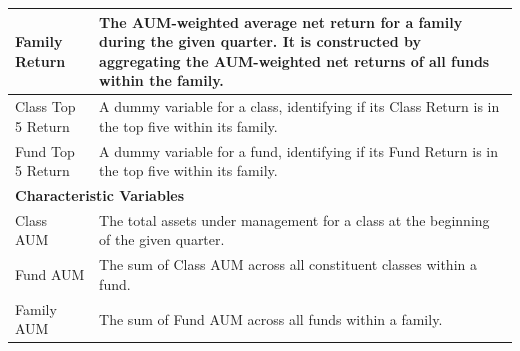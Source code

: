 \begin{longtable}{lp{}}
    \midrule
    Family Return                  & The AUM-weighted average net return for a family during the given quarter. It is constructed by aggregating the AUM-weighted net returns of all funds within the family.                                                                                                                                          \\
    \midrule
    Class Top 5 Return             & A dummy variable for a class, identifying if its Class Return is in the top five within its family.                                                                                                                                                                                                               \\
    \midrule
    Fund Top 5 Return              & A dummy variable for a fund, identifying if its Fund Return is in the top five within its family.                                                                                                                                                                                                                 \\
    \midrule
    \multicolumn{2}{l}{\textbf{Characteristic Variables}}                                                                                                                                                                                                                                                                                            \\
    \midrule
    Class AUM                      & The total assets under management for a class at the beginning of the given quarter.                                                                                                                                                                                                                              \\
    \midrule
    Fund AUM                       & The sum of Class AUM across all constituent classes within a fund.                                                                                                                                                                                                                                                \\
    \midrule
    Family AUM                     & The sum of Fund AUM across all funds within a family.                                                                                                                                                                                                                                                             \\

\end{longtable}
